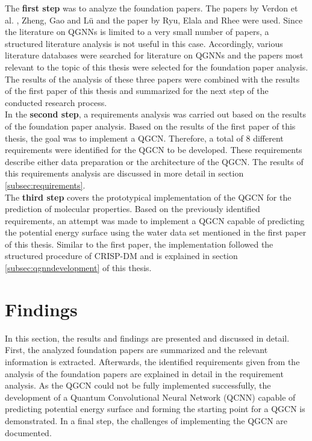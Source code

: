The \textbf{first step} was to analyze the foundation papers. The papers by Verdon et al. \cite{verdon_quantum_2019}, Zheng, Gao and Lü \cite{zheng2021quantum} and the paper by Ryu, Elala and Rhee \cite{ryu2023quantum} were used. Since the literature on QGNNs is limited to a very small number of papers, a structured literature analysis is not useful in this case. Accordingly, various literature databases were searched for literature on QGNNs and the papers most relevant to the topic of this thesis were selected for the foundation paper analysis. The results of the analysis of these three papers were combined with the results of the first paper of this thesis and summarized for the next step of the conducted research process. \\

In the \textbf{second step}, a requirements analysis was carried out based on the results of the foundation paper analysis. Based on the results of the first paper of this thesis, the goal was to implement a QGCN. Therefore, a total of 8 different requirements were identified for the QGCN to be developed. These requirements describe either data preparation or the architecture of the QGCN. The results of this requirements analysis are discussed in more detail in section \ref{subsec:requirements}. \\

The \textbf{third step} covers the prototypical implementation of the QGCN for the prediction of molecular properties. Based on the previously identified requirements, an attempt was made to implement a QGCN capable of predicting the potential energy surface using the water data set mentioned in the first paper of this thesis. Similar to the first paper, the implementation followed the structured procedure of CRISP-DM \cite{wirth2000crisp} and is explained in section \ref{subsec:qgnndevelopment} of this thesis. 

\section{Findings}
In this section, the results and findings are presented and discussed in detail. First, the analyzed foundation papers are summarized and the relevant information is extracted. Afterwards, the identified requirements given from the analysis of the foundation papers are explained in detail in the requirement analysis. As the QGCN could not be fully implemented successfully, the development of a Quantum Convolutional Neural Network (QCNN) capable of predicting potential energy surface and forming the starting point for a QGCN is demonstrated. In a final step, the challenges of implementing the QGCN are documented.

